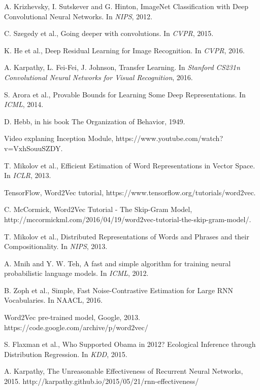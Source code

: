 \begin{thebibliography}{999}
A. Krizhevsky, I. Sutskever and G. Hinton, ImageNet Classification with Deep Convolutional
Neural Networks. In \textit{NIPS}, 2012.

C. Szegedy et al., Going deeper with convolutions. In \textit{CVPR}, 2015.

K. He et al., Deep Residual Learning for Image Recognition. In \textit{CVPR}, 2016.

A. Karpathy, L. Fei-Fei, J. Johnson, Transfer Learning. In \textit{Stanford CS231n Convolutional Neural Networks for Visual Recognition}, 2016.

S. Arora et al., Provable Bounds for Learning Some Deep Representations. In \textit{ICML}, 2014. 

D. Hebb, in his book The Organization of Behavior, 1949.

Video explaning Inception Module, https://www.youtube.com/watch?v=VxhSouuSZDY.

T. Mikolov et al., Efficient Estimation of Word Representations in Vector Space. In \textit{ICLR}, 2013.

TensorFlow, Word2Vec tutorial, https://www.tensorflow.org/tutorials/word2vec.

C. McCormick, Word2Vec Tutorial - The Skip-Gram Model, http://mccormickml.com/2016/04/19/word2vec-tutorial-the-skip-gram-model/.

T. Mikolov et al., Distributed Representations of Words and Phrases and their Compositionality. In \textit{NIPS}, 2013.

A. Mnih and Y. W. Teh, A fast and simple algorithm for training neural probabilistic language models. In \textit{ICML}, 2012.

B. Zoph et al., Simple, Fast Noise-Contrastive Estimation for Large RNN Vocabularies. In {NAACL}, 2016.

Word2Vec pre-trained model, Google, 2013. https://code.google.com/archive/p/word2vec/

S. Flaxman et al., Who Supported Obama in 2012? Ecological Inference through Distribution Regression. In \textit{KDD}, 2015.

A. Karpathy, The Unreasonable Effectiveness of Recurrent Neural Networks, 2015. http://karpathy.github.io/2015/05/21/rnn-effectiveness/


\end{thebibliography}

